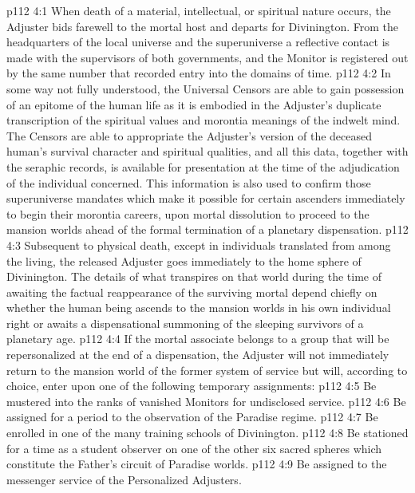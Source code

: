 \vs p112 4:1 When death of a material, intellectual, or spiritual nature occurs, the Adjuster bids farewell to the mortal host and departs for Divinington. From the headquarters of the local universe and the superuniverse a reflective contact is made with the supervisors of both governments, and the Monitor is registered out by the same number that recorded entry into the domains of time.
\vs p112 4:2 In some way not fully understood, the Universal Censors are able to gain possession of an epitome of the human life as it is embodied in the Adjuster’s duplicate transcription of the spiritual values and morontia meanings of the indwelt mind. The Censors are able to appropriate the Adjuster’s version of the deceased human’s survival character and spiritual qualities, and all this data, together with the seraphic records, is available for presentation at the time of the adjudication of the individual concerned. This information is also used to confirm those superuniverse mandates which make it possible for certain ascenders immediately to begin their morontia careers, upon mortal dissolution to proceed to the mansion worlds ahead of the formal termination of a planetary dispensation.
\vs p112 4:3 Subsequent to physical death, except in individuals translated from among the living, the released Adjuster goes immediately to the home sphere of Divinington. The details of what transpires on that world during the time of awaiting the factual reappearance of the surviving mortal depend chiefly on whether the human being ascends to the mansion worlds in his own individual right or awaits a dispensational summoning of the sleeping survivors of a planetary age.
\vs p112 4:4 If the mortal associate belongs to a group that will be repersonalized at the end of a dispensation, the Adjuster will not immediately return to the mansion world of the former system of service but will, according to choice, enter upon one of the following temporary assignments:
\vs p112 4:5 \bibnobreakspace Be mustered into the ranks of vanished Monitors for undisclosed service.
\vs p112 4:6 \bibnobreakspace Be assigned for a period to the observation of the Paradise regime.
\vs p112 4:7 \bibnobreakspace Be enrolled in one of the many training schools of Divinington.
\vs p112 4:8 \bibnobreakspace Be stationed for a time as a student observer on one of the other six sacred spheres which constitute the Father’s circuit of Paradise worlds.
\vs p112 4:9 \bibnobreakspace Be assigned to the messenger service of the Personalized Adjusters.
